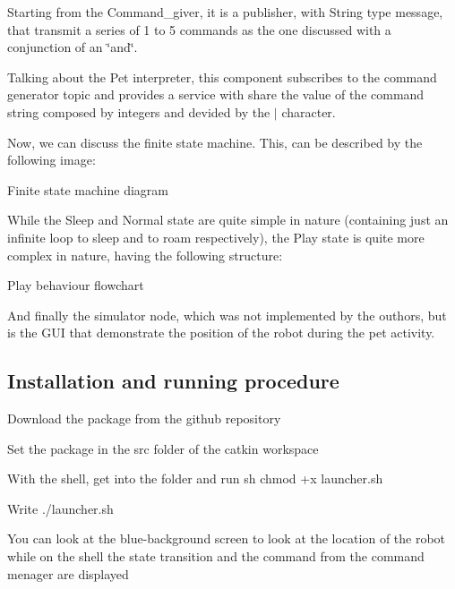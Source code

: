 Starting from the Command\+\_\+giver, it is a publisher, with String type message, that transmit a series of 1 to 5 commands as the one discussed with a conjunction of an \char`\"{}and\char`\"{}.

Talking about the Pet interpreter, this component subscribes to the command generator topic and provides a service with share the value of the command string composed by integers and devided by the \textquotesingle{}$\vert$\textquotesingle{} character.

Now, we can discuss the finite state machine. This, can be described by the following image\+:

 \begin{center}Finite state machine diagram\end{center}  While the \textquotesingle{}Sleep\textquotesingle{} and \textquotesingle{}Normal\textquotesingle{} state are quite simple in nature (containing just an infinite loop to sleep and to roam respectively), the \textquotesingle{}Play\textquotesingle{} state is quite more complex in nature, having the following structure\+:  \begin{center}Play behaviour flowchart\end{center} 

And finally the simulator node, which was not implemented by the outhors, but is the G\+UI that demonstrate the position of the robot during the pet activity.

\subsection*{Installation and running procedure}


\begin{DoxyItemize}
\item Download the package from the github repository
\item Set the package in the src folder of the catkin workspace
\item With the shell, get into the folder and run \textquotesingle{}\textquotesingle{}\textquotesingle{}sh chmod +x launcher.\+sh \textquotesingle{}\textquotesingle{}\textquotesingle{}
\item Write ./launcher.sh
\item You can look at the blue-\/background screen to look at the location of the robot while on the shell the state transition and the command from the command menager are displayed
\item 
\end{DoxyItemize}


